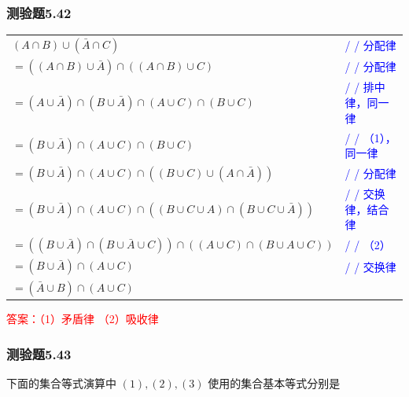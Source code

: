 \documentclass[UTF8, heading=true]{ctexart}
\begin{document}
\subsubsection{测验题5.42}


\begin{table}[htbp]
  \centering
  \renewcommand{\arraystretch}{1.5}
  \begin{tabular}{ll}
    $(A \cap B) \cup (\bar{A} \cap C)$ & \textcolor{blue}{/ / 分配律} \\
    $=((A \cap B) \cup \bar{A}) \cap ((A \cap B) \cup C)$ & \textcolor{blue}{/ / 分配律} \\
    $=(A \cup \bar{A}) \cap (B \cup \bar{A}) \cap (A \cup C) \cap (B \cup C)$ & \textcolor{blue}{/ / 排中律，同一律} \\
    $=(B \cup \bar{A}) \cap (A \cup C) \cap (B \cup C)$ & \textcolor{blue}{/ / （1），同一律} \\
    $=(B \cup \bar{A}) \cap (A \cup C) \cap ((B \cup C) \cup (A \cap \bar{A}))$ & \textcolor{blue}{/ / 分配律} \\
    $=(B \cup \bar{A}) \cap (A \cup C) \cap ((B \cup C \cup A) \cap (B \cup C \cup \bar{A}))$ & \textcolor{blue}{/ / 交换律，结合律} \\
    $=((B \cup \bar{A}) \cap (B \cup \bar{A} \cup C)) \cap ((A \cup C) \cap (B \cup A \cup C))$ & \textcolor{blue}{/ / （2）} \\
    $=(B \cup \bar{A}) \cap (A \cup C)$ & \textcolor{blue}{/ / 交换律} \\
    $=(\bar{A} \cup B) \cap (A \cup C)$ &  \\
  \end{tabular}
\end{table}


\textcolor{red}
{
  答案：（1）矛盾律
  （2）吸收律
}


\subsubsection{测验题5.43}

下面的集合等式演算中 $(1),(2),(3)$ 使用的集合基本等式分别是

\clearpage
\end{document}
